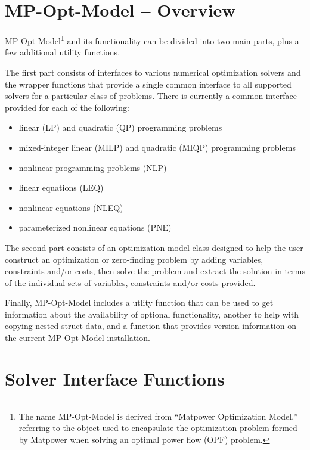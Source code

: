 \documentclass[12pt]{article}
\newcommand{\matpower}[0]{{\sc Matpower}}
\newcommand{\mpom}[0]{\mbox{MP-Opt-Model}}
\numberwithin{equation}{section}
\numberwithin{table}{section}
\numberwithin{figure}{section}
\begin{document}
\clearpage
\section{\mpom{} -- Overview}
\label{sec:mpom}

\mpom{}\footnote{The name \mpom{} is derived from ``\matpower{} Optimization Model,'' referring to the object used to encapsulate the optimization problem formed by \matpower{} when solving an optimal power flow (OPF) problem.} and its functionality can be divided into two main parts, plus a few additional utility functions.

The first part consists of interfaces to various numerical optimization solvers and the wrapper functions that provide a single common interface to all supported solvers for a particular class of problems. There is currently a common interface provided for each of the following:
\begin{itemize}
\item linear (LP) and quadratic (QP) programming problems
\item mixed-integer linear (MILP) and quadratic (MIQP) programming problems
\item nonlinear programming problems (NLP)
\item linear equations (LEQ)
\item nonlinear equations (NLEQ)
\item parameterized nonlinear equations (PNE)
\end{itemize}

The second part consists of an optimization model class designed to help the user construct an optimization or zero-finding problem by adding variables, constraints and/or costs, then solve the problem and extract the solution in terms of the individual sets of variables, constraints and/or costs provided.

Finally, \mpom{} includes a utlity function that can be used to get information about the availability of optional functionality, another to help with copying nested struct data, and a function that provides version information on the current \mpom{} installation.


\clearpage
\section{Solver Interface Functions}
\label{sec:master_solvers}
\end{document}
